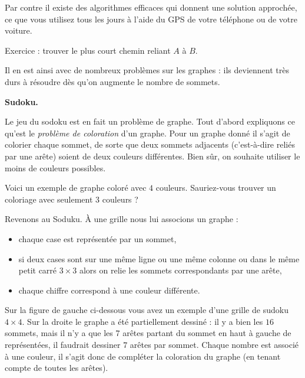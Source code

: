 \documentclass[11pt,class=report,crop=false]{standalone}
\begin{document}
Par contre il existe des algorithmes efficaces qui donnent une solution approchée, ce que vous utilisez tous les jours à l'aide du GPS de votre téléphone ou de votre voiture.

\medskip

Exercice : trouver le plus court chemin reliant $A$ à $B$.

Il en est ainsi avec de nombreux problèmes sur les graphes : ils deviennent très durs à résoudre dès qu'on augmente le nombre de sommets.


\bigskip


\textbf{Sudoku.}

Le jeu du sodoku est en fait un problème de graphe.
Tout d'abord expliquons ce qu'est le \emph{problème de coloration} d'un graphe. Pour un graphe donné il s'agit de colorier chaque sommet, de sorte que deux sommets adjacents (c'est-à-dire reliés par une arête) soient de deux couleurs différentes. 
Bien sûr, on souhaite utiliser le moins de couleurs possibles.

Voici un exemple de graphe coloré avec $4$ couleurs. Sauriez-vous trouver un coloriage avec seulement $3$ couleurs ?


Revenons au Soduku. À une grille nous lui associons un graphe : 
\begin{itemize}
	\item chaque case est représentée par un sommet,
	\item si deux cases sont sur une même ligne ou une même colonne ou dans le même petit carré $3 \times 3$ alors on relie les sommets correspondants par une arête,
	\item chaque chiffre correspond à une couleur différente.
\end{itemize}


Sur la figure de gauche ci-dessous vous avez un exemple d'une grille de sudoku $4 \times 4$. 
Sur la droite le graphe a été partiellement dessiné : il y a bien les $16$ sommets, mais il n'y a que les $7$ arêtes partant du sommet en haut à gauche de représentées, il faudrait dessiner $7$ arêtes par sommet. 
Chaque nombre est associé à une couleur, il s'agit donc de compléter la coloration du graphe (en tenant compte de toutes les arêtes).

\end{document}
